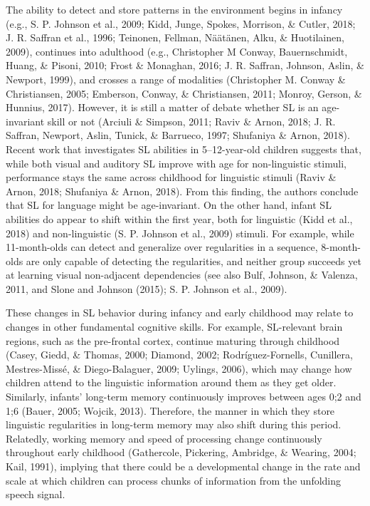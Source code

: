 \documentclass[man,mask,floatsintext]{apa6}
\theoremstyle{definition}
\theoremstyle{definition}
\theoremstyle{definition}
\theoremstyle{remark}
\begin{document}
The ability to detect and store patterns in the environment begins in
infancy (e.g., S. P. Johnson et al., 2009; Kidd, Junge, Spokes,
Morrison, \& Cutler, 2018; J. R. Saffran et al., 1996; Teinonen,
Fellman, Näätänen, Alku, \& Huotilainen, 2009), continues into adulthood
(e.g., Christopher M Conway, Bauernschmidt, Huang, \& Pisoni, 2010;
Frost \& Monaghan, 2016; J. R. Saffran, Johnson, Aslin, \& Newport,
1999), and crosses a range of modalities (Christopher M. Conway \&
Christiansen, 2005; Emberson, Conway, \& Christiansen, 2011; Monroy,
Gerson, \& Hunnius, 2017). However, it is still a matter of debate
whether SL is an age-invariant skill or not (Arciuli \& Simpson, 2011;
Raviv \& Arnon, 2018; J. R. Saffran, Newport, Aslin, Tunick, \&
Barrueco, 1997; Shufaniya \& Arnon, 2018). Recent work that investigates
SL abilities in 5--12-year-old children suggests that, while both visual
and auditory SL improve with age for non-linguistic stimuli, performance
stays the same across childhood for linguistic stimuli (Raviv \& Arnon,
2018; Shufaniya \& Arnon, 2018). From this finding, the authors conclude
that SL for language might be age-invariant. On the other hand, infant
SL abilities do appear to shift within the first year, both for
linguistic (Kidd et al., 2018) and non-linguistic (S. P. Johnson et al.,
2009) stimuli. For example, while 11-month-olds can detect and
generalize over regularities in a sequence, 8-month-olds are only
capable of detecting the regularities, and neither group succeeds yet at
learning visual non-adjacent dependencies (see also Bulf, Johnson, \&
Valenza, 2011, and Slone and Johnson (2015); S. P. Johnson et al.,
2009).

These changes in SL behavior during infancy and early childhood may
relate to changes in other fundamental cognitive skills. For example,
SL-relevant brain regions, such as the pre-frontal cortex, continue
maturing through childhood (Casey, Giedd, \& Thomas, 2000; Diamond,
2002; Rodríguez-Fornells, Cunillera, Mestres-Missé, \& Diego-Balaguer,
2009; Uylings, 2006), which may change how children attend to the
linguistic information around them as they get older. Similarly,
infants' long-term memory continuously improves between ages 0;2 and 1;6
(Bauer, 2005; Wojcik, 2013). Therefore, the manner in which they store
linguistic regularities in long-term memory may also shift during this
period. Relatedly, working memory and speed of processing change
continuously throughout early childhood (Gathercole, Pickering,
Ambridge, \& Wearing, 2004; Kail, 1991), implying that there could be a
developmental change in the rate and scale at which children can process
chunks of information from the unfolding speech signal.
\end{document}
